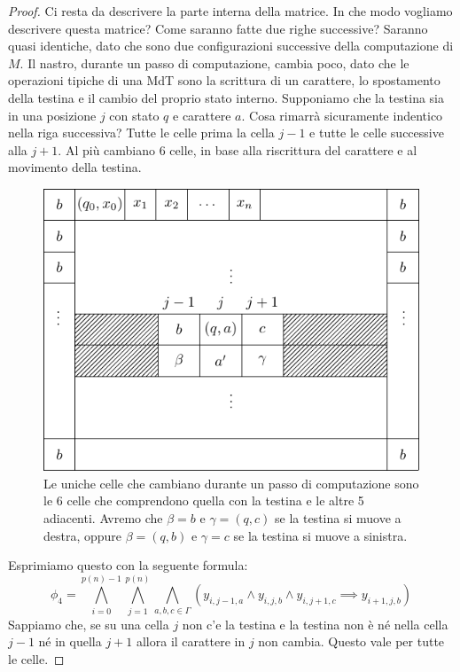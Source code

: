 \begin{proof}
    Ci resta da descrivere la parte interna della matrice. In che modo vogliamo descrivere questa
    matrice? Come saranno fatte due righe successive? Saranno quasi identiche, dato che sono due
    configurazioni successive della computazione di $M$. Il nastro, durante un passo di
    computazione, cambia poco, dato che le operazioni tipiche di una MdT sono la scrittura di un
    carattere, lo spostamento della testina e il cambio del proprio stato interno. Supponiamo che la
    testina sia in una posizione $j$ con stato $q$ e carattere $a$. Cosa rimarrà sicuramente
    indentico nella riga successiva? Tutte le celle prima la cella $j-1$ e tutte le celle successive
    alla $j+1$. Al più cambiano 6 celle, in base alla riscrittura del carattere e al movimento
    della testina. 

    \begin{figure}[h]
        \begin{center}
            \includegraphics{./img/NPClass/SATproof3.pdf}
            \caption{Le uniche celle che cambiano durante un passo di computazione sono le 6 celle
                che comprendono quella con la testina e le altre 5 adiacenti. Avremo che $\beta = b$ e
                $\gamma = (q,c)$ se la testina si muove a destra, oppure $\beta = (q,b)$ e $\gamma = c$
            se la testina si muove a sinistra.}
        \end{center}
    \end{figure}

    Esprimiamo questo con la seguente formula:
    \begin{equation*}
        \phi_{4} = \bigwedge_{i=0}^{p(n)-1}\bigwedge_{j=1}^{p(n)}\bigwedge_{a,b,c\in \Gamma}
        (y_{i,j-1,a} \land y_{i,j,b} \land y_{i,j+1,c} \implies y_{i+1,j,b})
    \end{equation*}
    Sappiamo che, se su una cella $j$ non c'e la testina e la testina non è né nella cella $j-1$
    né in quella $j+1$ allora il carattere in $j$ non cambia.  Questo vale per tutte le celle.


\end{proof}
